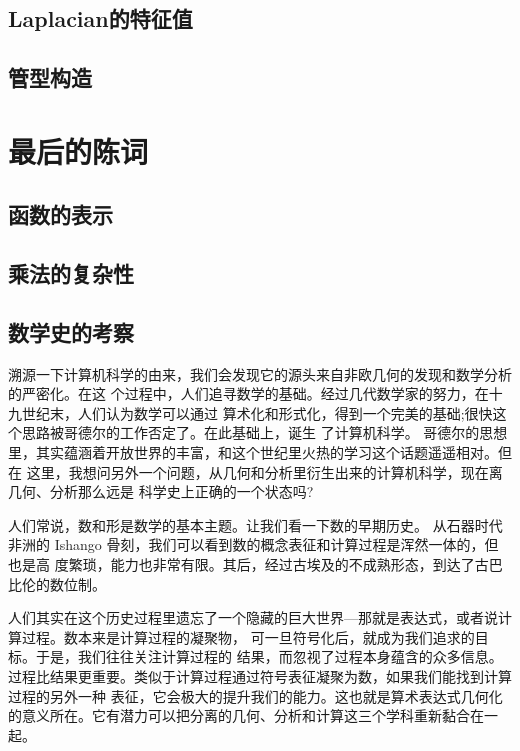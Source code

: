 \documentclass[a4paper,12pt]{article}
\numberwithin{definition}{section}
\numberwithin{lemma}{section}
\numberwithin{proposition}{section}
\numberwithin{theorem}{section}
\numberwithin{grammar}{section}
\numberwithin{program}{section}
\numberwithin{convention}{section}
\numberwithin{corollary}{section}
\begin{document}
\subsection{Laplacian的特征值}

\subsection{管型构造}

\newpage

\section{最后的陈词}

\subsection{函数的表示}

\subsection{乘法的复杂性}

\subsection{数学史的考察}

溯源一下计算机科学的由来，我们会发现它的源头来自非欧几何的发现和数学分析的严密化。在这
个过程中，人们追寻数学的基础。经过几代数学家的努力，在十九世纪末，人们认为数学可以通过
算术化和形式化，得到一个完美的基础;很快这个思路被哥德尔的工作否定了。在此基础上，诞生
了计算机科学。 哥德尔的思想里，其实蕴涵着开放世界的丰富，和这个世纪里火热的学习这个话题遥遥相对。但在
这里，我想问另外一个问题，从几何和分析里衍生出来的计算机科学，现在离几何、分析那么远是
科学史上正确的一个状态吗?

人们常说，数和形是数学的基本主题。让我们看一下数的早期历史。
从石器时代非洲的 Ishango ⻣刻，我们可以看到数的概念表征和计算过程是浑然一体的，但也是高
度繁琐，能力也非常有限。其后，经过古埃及的不成熟形态，到达了古巴比伦的数位制。

人们其实在这个历史过程里遗忘了一个隐藏的巨大世界—那就是表达式，或者说计算过程。数本来是计算过程的凝聚物，
可一旦符号化后，就成为我们追求的目标。于是，我们往往关注计算过程的 结果，而忽视了过程本身蕴含的众多信息。
过程比结果更重要。类似于计算过程通过符号表征凝聚为数，如果我们能找到计算过程的另外一种
表征，它会极大的提升我们的能力。这也就是算术表达式几何化的意义所在。它有潜力可以把分离的几何、分析和计算这三个学科重新黏合在一起。
\end{document}
